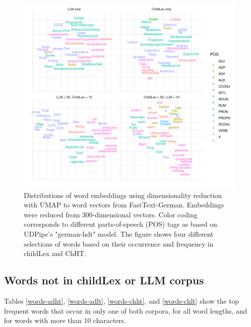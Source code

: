 \documentclass[doc, a4paper, anonymous]{apa7}
\begin{document}
\begin{figure}[!htbp]
    \includegraphics[width = 0.6\paperwidth]{figures/embed100.pdf}
    \caption{Distributions of word embeddings using dimensionality reduction with UMAP to word vectors from FastText-German. Embeddings were reduced from 300-dimensional vectors. Color coding corresponds to different parts-of-speech (POS) tags as based on UDPipe's "german-hdt" model. The figure shows four different selections of words based on their occurrence and frequency in childLex and ChHT.}
    \label{fig:embed100}
\end{figure}

\clearpage


\subsection{Words not in childLex or LLM corpus}

Tables \ref{words-adht}, \ref{words-adlt}, \ref{words-chht}, and \ref{words-chlt} show the top frequent words that occur in only one of both corpora, for all word lengths, and for words with more than 10 characters.
\end{document}
